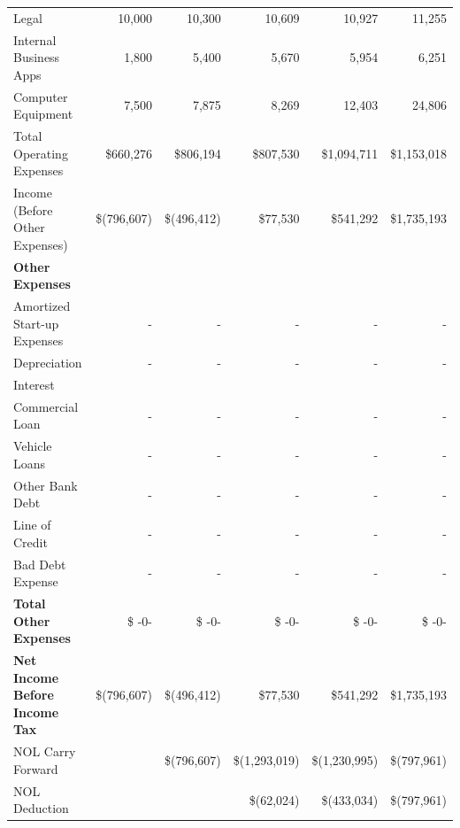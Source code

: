 \documentclass[10pt,openany]{book}
\begin{document}
\begin{landscape}
\begin{center}
\begin{longtable}[\textwidth]{@{}p{10cm}rrrrr@{}}
      \hspace{3mm} Legal & 10,000 & 10,300 & 10,609 & 10,927 & 11,255 \\
      \hspace{3mm} Internal Business Apps & 1,800 & 5,400 & 5,670 & 5,954 & 6,251 \\
      \hspace{3mm} Computer Equipment & 7,500 & 7,875 & 8,269 & 12,403 & 24,806 \\
      \hspace{3mm} Total Operating Expenses & \$660,276 & \$806,194 & \$807,530 & \$1,094,711 & \$1,153,018 \\
      \hspace{3mm} Income (Before Other Expenses) & \$(796,607) & \$(496,412) & \$77,530 & \$541,292 & \$1,735,193 \\
      \textbf{Other Expenses} & & & & & \\
      \midrule
      \hspace{3mm} Amortized Start-up Expenses & - & - & - & - & - \\
      \hspace{3mm} Depreciation & - & - & - & - & - \\
      \hspace{3mm} Interest & & & & & \\
      \hspace{3mm} Commercial Loan & - & - & - & - & - \\
      \hspace{3mm} Vehicle Loans & - & - & - & - & - \\
      \hspace{3mm} Other Bank Debt & - & - & - & - & - \\
      \hspace{3mm} Line of Credit & - & - & - & - & - \\
      \hspace{3mm} Bad Debt Expense & - & - & - & - & - \\
      \textbf{Total Other Expenses} & \$ -0- & \$ -0- & \$ -0- & \$ -0- & \$ -0- \\
      \textbf{Net Income Before Income Tax} & \$(796,607) & \$(496,412) & \$77,530 & \$541,292 & \$1,735,193 \\
      \hspace{3mm} NOL Carry Forward & & \$(796,607) & \$(1,293,019) & \$(1,230,995) & \$(797,961) \\
      \hspace{3mm} NOL Deduction & & & \$(62,024) & \$(433,034) & \$(797,961) \\

\end{longtable}
\end{center}
\end{landscape}
\end{document}
